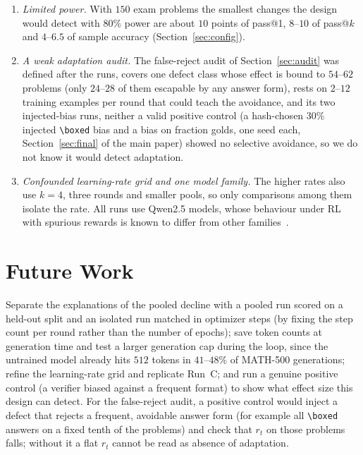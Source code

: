 \documentclass[runningheads]{llncs}
\begin{document}
\begin{enumerate}
was varied. No arm in any design improves detectably on its round~0, including training on
reference solutions and on full Qwen2.5-7B-Instruct solutions (Section~\ref{app:teacher}), so we have no positive reference showing that this recipe
can help a 1.5B model at all; the declines may partly reflect the recipe rather
than self-training.
\item \emph{Limited power.} With $150$ exam problems the smallest changes the
design would detect with $80\%$ power are about $10$ points of pass@1, $8$--$10$
of pass@$k$ and $4$--$6.5$ of sample accuracy (Section~\ref{sec:config}).
\item \emph{A weak adaptation audit.} The false-reject audit of
Section~\ref{sec:audit} was defined after the runs, covers one defect class
whose effect is bound to $54$--$62$ problems (only $24$--$28$ of them escapable
by any answer form), rests on $2$--$12$ training examples per round that could
teach the avoidance, and its two injected-bias runs, neither a valid positive control (a hash-chosen 30\% injected
\verb|\boxed| bias and a bias on fraction golds, one seed each,
Section~\ref{sec:final} of the main paper) showed
no selective avoidance, so we do not know it would detect adaptation.
\item \emph{Confounded learning-rate grid and one model family.} The higher
rates also use $k=4$, three rounds and smaller pools, so only comparisons among
them isolate the rate. All runs use Qwen2.5 models, whose behaviour under RL
with spurious rewards is known to differ from other families~\cite{ref_spurious}.
\end{enumerate}

\section{Future Work}
\label{app:future}

Separate the explanations of the pooled decline with a pooled run scored on a
held-out split and an isolated run matched in optimizer steps (by fixing the
step count per round rather than the number of epochs); save token
counts at generation time and test a larger generation cap during the loop, since
the untrained model already hits $512$ tokens in $41$--$48\%$ of MATH-500 generations;
refine the learning-rate grid and replicate Run~C;
and run a genuine positive control (a verifier biased against a frequent format) to show
what effect size this design can detect. For the false-reject audit, a
positive control would inject a defect that rejects a frequent, avoidable
answer form (for example all \verb|\boxed| answers on a fixed tenth of the
problems) and check that $r_t$ on those problems falls; without it a flat
$r_t$ cannot be read as absence of adaptation.
\end{document}
